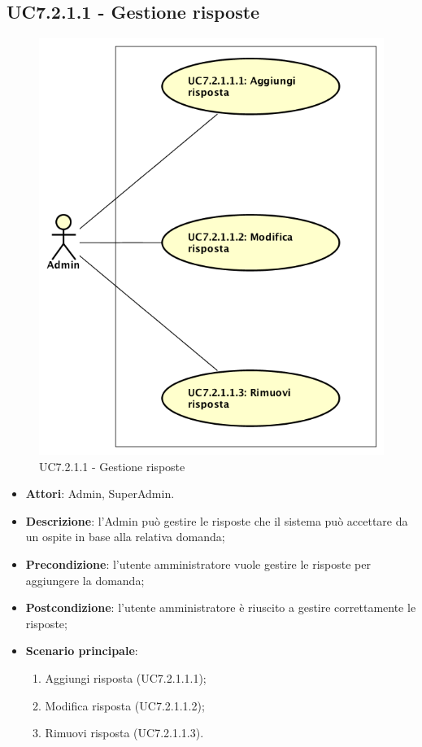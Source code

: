 \documentclass[../AnalisiDeiRequisiti_v4.0.0.tex]{subfiles}
\begin{document}
\begin{itemize}
\subsection{UC7.2.1.1 - Gestione risposte} 
\label{sssec:UC7.2.1.1} 
\begin{figure}[!h]
	\centering
	\includegraphics[scale=0.7]{UseCases/UC7_GestionePannelloAdmin/UC7_2_GestioneDomande/UC7_2_1_AggiungiDomanda/UC7_2_1_1_GestioneRisposte/UC7_2_1_1_GestioneRisposte.png}
	\caption{UC7.2.1.1 - Gestione risposte}
\end{figure}
\begin{itemize} 
\item \textbf{Attori}: Admin, SuperAdmin.
\item \textbf{Descrizione}: l'Admin può gestire le risposte che il sistema può accettare da un ospite in base alla relativa domanda;
\item \textbf{Precondizione}: l'utente amministratore vuole gestire le risposte per aggiungere la domanda;
\item \textbf{Postcondizione}: l'utente amministratore è riuscito a gestire correttamente le risposte;
\item \textbf{Scenario principale}: \begin{enumerate}\item Aggiungi risposta (UC7.2.1.1.1);\item Modifica risposta (UC7.2.1.1.2);\item Rimuovi risposta (UC7.2.1.1.3).
 \end{enumerate}
\end{itemize}  
\newpage

\end{itemize}
\end{document}
